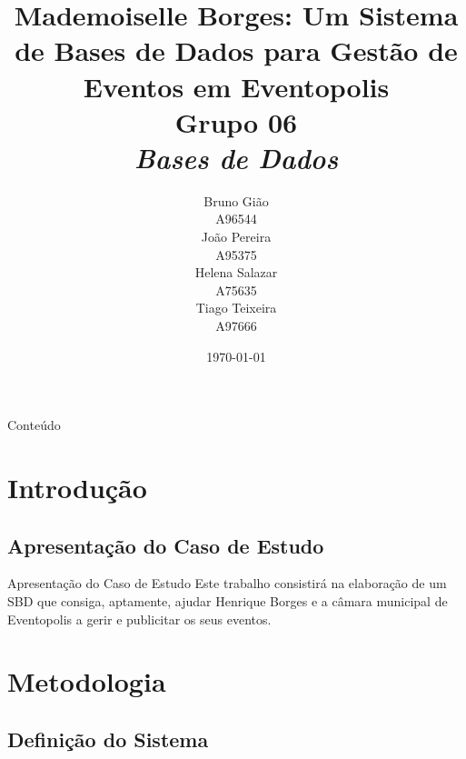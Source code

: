 \documentclass[compress,svgnames,handout,13.7pt]{beamer}
\title[Checkpoint]
    {\textbf{Mademoiselle Borges: Um Sistema de Bases de Dados para
Gestão de Eventos em Eventopolis\\
    \textbf{Grupo 06} \\
    \textit{Bases de Dados}}
}
\author[G06]{%
  \begin{tabular}{c}
    Bruno Gião \\
    A96544
  \end{tabular}
  \begin{tabular}{c}
    João Pereira \\
    A95375
  \end{tabular}
  \begin{tabular}{c}
    Helena Salazar \\
    A75635
  \end{tabular}
  \begin{tabular}{c}
    Tiago Teixeira \\
    A97666
  \end{tabular}
}
\date{\today}
\begin{document}
\thispagestyle{empty}
\frame{\titlepage}


\begin{frame}{Conteúdo}
\setcounter{secnumdepth}{2}
\setcounter{tocdepth}{2}
\tableofcontents
\end{frame}


\section{Introdução}

\subsection{Apresentação do Caso de Estudo}
\begin{frame}{Apresentação do Caso de Estudo}
Este trabalho consistirá na elaboração de um SBD que consiga, aptamente, ajudar Henrique Borges
e a c\^amara municipal de Eventopolis a gerir e publicitar os seus eventos.
\end{frame}

\section{Metodologia}

\subsection{Definição do Sistema}
\end{document}
